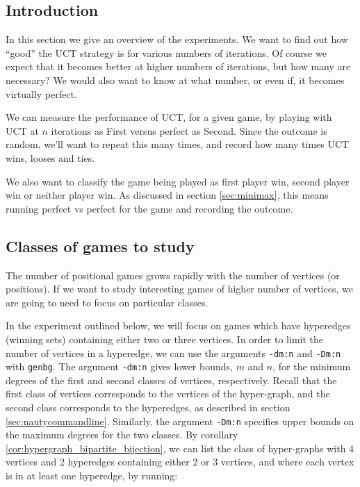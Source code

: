 \subsection{Introduction}

In this section we give an overview of the experiments.
We want to find out how ``good'' the UCT strategy is for various numbers of iterations.
Of course we expect that it becomes better at higher numbers of iterations, but how many are necessary?
We would also want to know at what number, or even if, it becomes virtually perfect.

We can measure the performance of UCT, for a given game, by playing with UCT at $n$ iterations as First versus perfect as Second.
Since the outcome is random, we'll want to repeat this many times, and record how many times UCT wins, looses and ties.

We also want to classify the game being played as first player win, second player win or neither player win.
As discussed in section \ref{sec:minimax}, this means running perfect vs perfect for the game and recording the outcome.


\subsection{Classes of games to study}

The number of positional games grows rapidly with the number of vertices (or positions).
If we want to study interesting games of higher number of vertices, we are going to need to focus on particular classes.

In the experiment outlined below, we will focus on games which have hyperedges (winning sets) containing either two or three vertices.
In order to limit the number of vertices in a hyperedge, we can use the arguments \texttt{-dm:n} and \texttt{-Dm:n} with \texttt{genbg}.
The argument \texttt{-dm:n} gives lower bounds, $m$ and $n$, for the minimum degrees of the first and second classes of vertices, respectively.
Recall that the first class of vertices corresponds to the vertices of the hyper-graph, and the second class corresponds to the hyperedges, as described in section \ref{sec:nautycommandline}.
Similarly, the argument \texttt{-Dm:n} specifies upper bounds on the maximum degrees for the two classes.
By corollary \ref{cor:hypergraph_bipartite_bijection}, we can list the class of hyper-graphs with 4 vertices and 2 hyperedges containing either 2 or 3 vertices, and where each vertex is in at least one hyperedge, by running:

